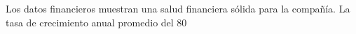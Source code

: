 

Los datos financieros muestran una salud financiera sólida para la compañía. La tasa de crecimiento anual promedio del 80%